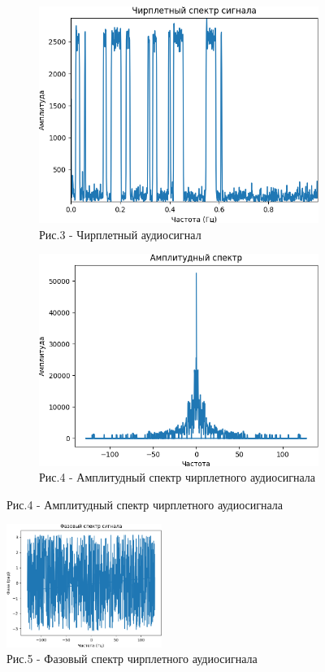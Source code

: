 \begin{figure}[H]
   \centering
   \begin{subfigure}{0.45\textwidth}
   	\centering
   	\includegraphics[width=\textwidth,height=0.7\textwidth]{media/ict/image66}
   	\caption*{Рис.3 - Чирплетный аудиосигнал}
   \end{subfigure}
   \begin{subfigure}{0.45\textwidth}
   	\centering
   	\includegraphics[width=\textwidth,height=0.7\textwidth]{media/ict/image67}
   	\caption*{Рис.4 - Амплитудный спектр чирплетного аудиосигнала}
   \end{subfigure}
\end{figure}

\begin{figure}[H]
   \centering
   \includegraphics[width=0.45\textwidth]{media/ict/image68}
   \caption*{Рис.5 - Фазовый спектр чирплетного аудиосигнала}
\end{figure}

